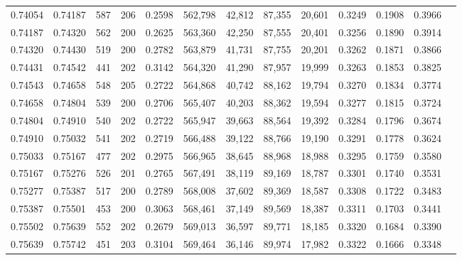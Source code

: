 \begin{tabular}{rrrrrrrrrrrrr}
0.74054 & 0.74187 &   587 & 206 &                                     0.2598 & 562,798 &  42,812 &  87,355 &  20,601 & 0.3249 & 0.1908 & 0.3966 \\
0.74187 & 0.74320 &   562 & 200 &                                     0.2625 & 563,360 &  42,250 &  87,555 &  20,401 & 0.3256 & 0.1890 & 0.3914 \\
0.74320 & 0.74430 &   519 & 200 &                                     0.2782 & 563,879 &  41,731 &  87,755 &  20,201 & 0.3262 & 0.1871 & 0.3866 \\
0.74431 & 0.74542 &   441 & 202 &                                     0.3142 & 564,320 &  41,290 &  87,957 &  19,999 & 0.3263 & 0.1853 & 0.3825 \\
0.74543 & 0.74658 &   548 & 205 &                                     0.2722 & 564,868 &  40,742 &  88,162 &  19,794 & 0.3270 & 0.1834 & 0.3774 \\
0.74658 & 0.74804 &   539 & 200 &                                     0.2706 & 565,407 &  40,203 &  88,362 &  19,594 & 0.3277 & 0.1815 & 0.3724 \\
0.74804 & 0.74910 &   540 & 202 &                                     0.2722 & 565,947 &  39,663 &  88,564 &  19,392 & 0.3284 & 0.1796 & 0.3674 \\
0.74910 & 0.75032 &   541 & 202 &                                     0.2719 & 566,488 &  39,122 &  88,766 &  19,190 & 0.3291 & 0.1778 & 0.3624 \\
0.75033 & 0.75167 &   477 & 202 &                                     0.2975 & 566,965 &  38,645 &  88,968 &  18,988 & 0.3295 & 0.1759 & 0.3580 \\
0.75167 & 0.75276 &   526 & 201 &                                     0.2765 & 567,491 &  38,119 &  89,169 &  18,787 & 0.3301 & 0.1740 & 0.3531 \\
0.75277 & 0.75387 &   517 & 200 &                                     0.2789 & 568,008 &  37,602 &  89,369 &  18,587 & 0.3308 & 0.1722 & 0.3483 \\
0.75387 & 0.75501 &   453 & 200 &                                     0.3063 & 568,461 &  37,149 &  89,569 &  18,387 & 0.3311 & 0.1703 & 0.3441 \\
0.75502 & 0.75639 &   552 & 202 &                                     0.2679 & 569,013 &  36,597 &  89,771 &  18,185 & 0.3320 & 0.1684 & 0.3390 \\
0.75639 & 0.75742 &   451 & 203 &                                     0.3104 & 569,464 &  36,146 &  89,974 &  17,982 & 0.3322 & 0.1666 & 0.3348 \\

\end{tabular}
